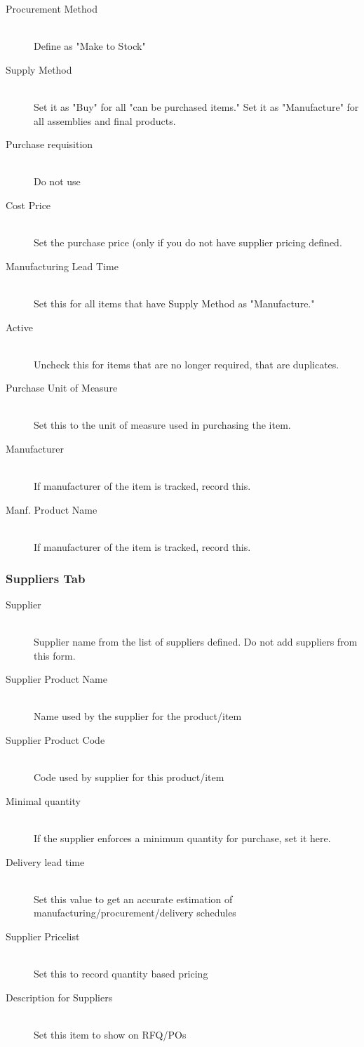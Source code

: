 \begin{description}
\item[Procurement Method] \hfill \\
Define as "Make to Stock"
\item[Supply Method] \hfill \\
Set it as "Buy" for all "can be purchased items." Set it as "Manufacture" for all assemblies and final products.
\item[Purchase requisition] \hfill \\
Do not use
\item[Cost Price] \hfill \\
Set the purchase price (only if you do not have supplier pricing defined.
\item[Manufacturing Lead Time] \hfill \\
Set this for all items that have Supply Method as "Manufacture."
\item[Active] \hfill \\
Uncheck this for items that are no longer required, that are duplicates.
\item[Purchase Unit of Measure] \hfill \\
Set this to the unit of measure used in purchasing the item.
\item[Manufacturer] \hfill \\
If manufacturer of the item is tracked, record this.
\item[Manf. Product Name] \hfill \\
If manufacturer of the item is tracked, record this.
\end{description}

\subsubsection{Suppliers Tab}

\begin{description}
\item[Supplier] \hfill \\
Supplier name from the list of suppliers defined. Do not add suppliers from this form.
\item[Supplier Product Name] \hfill \\
Name used by the supplier for the product/item
\item[Supplier Product Code] \hfill \\
Code used by supplier for this product/item
\item[Minimal quantity] \hfill \\
If the supplier enforces a minimum quantity for purchase, set it here.
\item[Delivery lead time] \hfill \\
Set this value to get an accurate estimation of manufacturing/procurement/delivery schedules
\item[Supplier Pricelist] \hfill \\
Set this to record quantity based pricing
\item[Description for Suppliers] \hfill \\
Set this item to show on RFQ/POs
\end{description}

